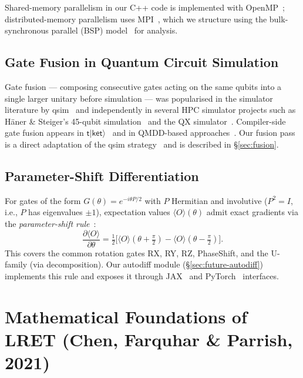 \documentclass[11pt,a4paper]{article}
\begin{document}
Shared-memory parallelism in our C++ code is implemented with
OpenMP~\cite{dagummenon1998}; distributed-memory parallelism uses
MPI~\cite{gropp1999mpi}, which we structure using the bulk-synchronous parallel (BSP)
model~\cite{valiant1990bsp} for analysis.

\subsection{Gate Fusion in Quantum Circuit Simulation}
\label{sec:bg-fusion}

Gate fusion --- composing consecutive gates acting on the same qubits into a single
larger unitary before simulation --- was popularised in the simulator literature by
qsim~\cite{qsim} and independently in several HPC simulator projects such as
H\"aner \& Steiger's 45-qubit simulation~\cite{hanersteiger2017} and the QX
simulator~\cite{khammassi2017qx}. Compiler-side gate fusion appears in
$\mathsf{t\vert ket\rangle}$~\cite{sivarajah2020tket} and in QMDD-based
approaches~\cite{zulehner2018qmdd}. Our fusion pass is a direct adaptation of the
qsim strategy~\cite{qsim} and is described in \S\ref{sec:fusion}.

\subsection{Parameter-Shift Differentiation}
\label{sec:bg-psr}

For gates of the form $G(\theta) = e^{-i\theta P/2}$ with $P$ Hermitian and involutive
($P^2 = I$, i.e., $P$ has eigenvalues $\pm 1$), expectation values
$\langle O\rangle(\theta)$ admit exact gradients via the \emph{parameter-shift
rule}~\cite{mitarai2018,schuld2019}:
\begin{equation}
  \frac{\partial \langle O \rangle}{\partial \theta}
  = \tfrac{1}{2}\bigl[
      \langle O \rangle(\theta + \tfrac{\pi}{2})
      - \langle O \rangle(\theta - \tfrac{\pi}{2})
    \bigr].
\end{equation}
This covers the common rotation gates RX, RY, RZ, PhaseShift, and the U-family
(via decomposition). Our autodiff module (\S\ref{sec:future-autodiff}) implements this
rule and exposes it through JAX~\cite{jax} and PyTorch~\cite{paszke2019pytorch}
interfaces.

\section[Mathematical Foundations of LRET]{Mathematical Foundations of LRET (Chen, Farquhar \& Parrish, 2021)}
\label{sec:math}
\end{document}
